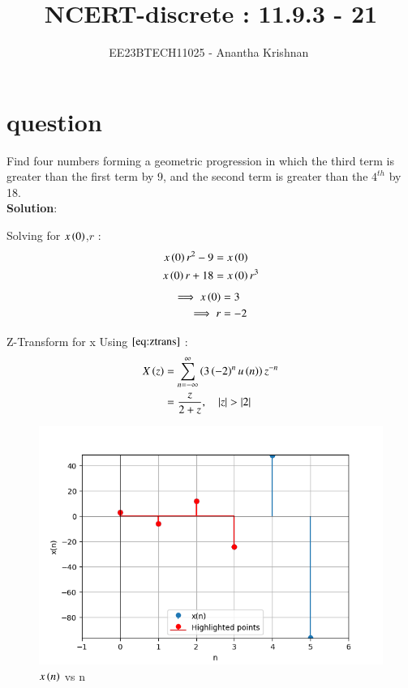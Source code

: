 \documentclass[journal,12pt,onecolumn]{IEEEtran}
\theoremstyle{remark}
\begin{document}

\vspace{3cm}

\title{NCERT-discrete : 11.9.3 - 21}
\author{EE23BTECH11025 - Anantha Krishnan $^{}$%
}
\maketitle
\bigskip

\renewcommand{\thefigure}{\theenumi}
\renewcommand{\thetable}{\theenumi}
\section{question}
Find four numbers forming a geometric progression in which the third term is greater than the first term by 9, and the second term is greater than the $4^{th}$ by 18.\\

\textbf{Solution}:

    
\begin{enumerate}
    Solving for $x\left(0\right)$,$r$ :
   \begin{align}
x\left(0\right)r^2 - 9 &= x\left(0\right) \label{eq:ee25-a1}\\
x\left(0\right)r + 18 &= x\left(0\right)r^3\label{eq:ee25-a2}
\end{align}
\begin{align}
    \implies
    x\left(0\right) &= 3\\
    \implies
    r &= -2
\end{align}

 Z-Transform for x 
    Using $\eqref{eq:ztrans}$ :
    \begin{align}
    X\left(z\right) &= \sum_{n=-\infty}^{\infty}\left(3\left(-2\right)^nu \left(n\right)\right)z^{-n} \\
    &= \frac{z}{2+z} ,\quad \left\vert z\right\vert>\left\vert2\right\vert 
    \end{align}
    
\end{enumerate}
    \begin{figure}[!ht]
    \centering
\graphicspath{ {figs/} }
\includegraphics[width=\columnwidth]{graph_1}
\caption{ $x\left(n\right)$ vs n }
\label{graph:ee25-ag2}
\end{figure}







 
\end{document}
